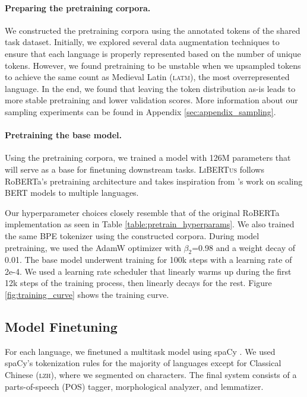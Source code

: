 \documentclass[11pt]{article}
\newcommand{\libertus}{\textsc{LiBERTus}}
\begin{document}
\paragraph{Preparing the pretraining corpora.}
We constructed the pretraining corpora using the annotated tokens of the shared task dataset.
Initially, we explored several data augmentation techniques to ensure that each language is properly represented based on the number of unique tokens.
However, we found pretraining to be unstable when we upsampled tokens to achieve the same count as Medieval Latin (\textsc{latm}), the most overrepresented language.
In the end, we found that leaving the token distribution as-is leads to more stable pretraining and lower validation scores.
More information about our sampling experiments can be found in Appendix \ref{sec:appendix_sampling}.

\paragraph{Pretraining the base model.}
Using the pretraining corpora, we trained a model with 126M parameters that will serve as a base for finetuning downstream tasks.
\libertus{} follows RoBERTa's pretraining architecture \cite{liu-etal-2019-roberta} and takes inspiration from \citet{conneau-etal-2020-unsupervised}'s work on scaling BERT models to multiple languages.



Our hyperparameter choices closely resemble that of the original RoBERTa implementation as seen in Table \ref{table:pretrain_hyperparams}.
We also trained the same BPE tokenizer \citep{sennrich-etal-2016-neural} using the constructed corpora.
During model pretraining, we used the AdamW optimizer with $\beta_2$=0.98 and a weight decay of 0.01.
The base model underwent training for 100k steps with a learning rate of 2e-4.
We used a learning rate scheduler that linearly warms up during the first 12k steps of the training process, then linearly decays for the rest.
Figure \ref{fig:training_curve} shows the training curve.

\subsection{Model Finetuning}

For each language, we finetuned a multitask model using spaCy \cite{honnibal-etal-2020-spacy}.
We used spaCy's tokenization rules for the majority of languages except for Classical Chinese (\textsc{lzh}), where we segmented on characters.
The final system consists of a parts-of-speech (POS) tagger, morphological analyzer, and lemmatizer.
\end{document}
